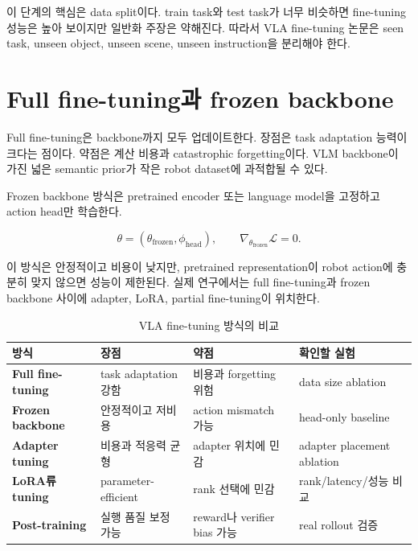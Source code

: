 이 단계의 핵심은 data split이다. train task와 test task가 너무 비슷하면 fine-tuning 성능은 높아 보이지만 일반화 주장은 약해진다. 따라서 VLA fine-tuning 논문은 seen task, unseen object, unseen scene, unseen instruction을 분리해야 한다.

\section{Full fine-tuning과 frozen backbone}

Full fine-tuning은 backbone까지 모두 업데이트한다. 장점은 task adaptation 능력이 크다는 점이다. 약점은 계산 비용과 catastrophic forgetting이다. VLM backbone이 가진 넓은 semantic prior가 작은 robot dataset에 과적합될 수 있다.

Frozen backbone 방식은 pretrained encoder 또는 language model을 고정하고 action head만 학습한다.

\begin{equation}
  \theta =
  (\theta_{\mathrm{frozen}}, \phi_{\mathrm{head}}),
  \qquad
  \nabla_{\theta_{\mathrm{frozen}}}\mathcal{L}=0.
\end{equation}

이 방식은 안정적이고 비용이 낮지만, pretrained representation이 robot action에 충분히 맞지 않으면 성능이 제한된다. 실제 연구에서는 full fine-tuning과 frozen backbone 사이에 adapter, LoRA, partial fine-tuning이 위치한다.

\begin{table}[t]
  \centering
  \caption{VLA fine-tuning 방식의 비교}
  \label{tab:finetuning_types}
  \begin{tabularx}{\textwidth}{>{\bfseries}p{30mm}XXX}
    \toprule
    방식 & 장점 & 약점 & 확인할 실험 \\
    \midrule
    Full fine-tuning & task adaptation 강함 & 비용과 forgetting 위험 & data size ablation \\
    Frozen backbone & 안정적이고 저비용 & action mismatch 가능 & head-only baseline \\
    Adapter tuning & 비용과 적응력 균형 & adapter 위치에 민감 & adapter placement ablation \\
    LoRA류 tuning & parameter-efficient & rank 선택에 민감 & rank/latency/성능 비교 \\
    Post-training & 실행 품질 보정 가능 & reward나 verifier bias 가능 & real rollout 검증 \\
    \bottomrule
  \end{tabularx}
\end{table}

